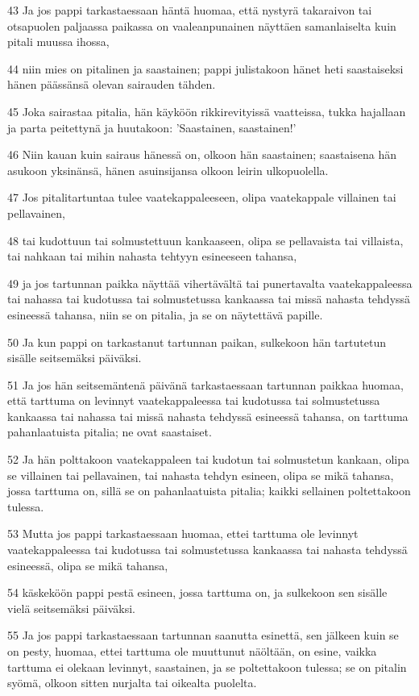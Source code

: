 \par 43 Ja jos pappi tarkastaessaan häntä huomaa, että nystyrä takaraivon tai otsapuolen paljaassa paikassa on vaaleanpunainen näyttäen samanlaiselta kuin pitali muussa ihossa,
\par 44 niin mies on pitalinen ja saastainen; pappi julistakoon hänet heti saastaiseksi hänen päässänsä olevan sairauden tähden.
\par 45 Joka sairastaa pitalia, hän käyköön rikkirevityissä vaatteissa, tukka hajallaan ja parta peitettynä ja huutakoon: 'Saastainen, saastainen!'
\par 46 Niin kauan kuin sairaus hänessä on, olkoon hän saastainen; saastaisena hän asukoon yksinänsä, hänen asuinsijansa olkoon leirin ulkopuolella.
\par 47 Jos pitalitartuntaa tulee vaatekappaleeseen, olipa vaatekappale villainen tai pellavainen,
\par 48 tai kudottuun tai solmustettuun kankaaseen, olipa se pellavaista tai villaista, tai nahkaan tai mihin nahasta tehtyyn esineeseen tahansa,
\par 49 ja jos tartunnan paikka näyttää vihertävältä tai punertavalta vaatekappaleessa tai nahassa tai kudotussa tai solmustetussa kankaassa tai missä nahasta tehdyssä esineessä tahansa, niin se on pitalia, ja se on näytettävä papille.
\par 50 Ja kun pappi on tarkastanut tartunnan paikan, sulkekoon hän tartutetun sisälle seitsemäksi päiväksi.
\par 51 Ja jos hän seitsemäntenä päivänä tarkastaessaan tartunnan paikkaa huomaa, että tarttuma on levinnyt vaatekappaleessa tai kudotussa tai solmustetussa kankaassa tai nahassa tai missä nahasta tehdyssä esineessä tahansa, on tarttuma pahanlaatuista pitalia; ne ovat saastaiset.
\par 52 Ja hän polttakoon vaatekappaleen tai kudotun tai solmustetun kankaan, olipa se villainen tai pellavainen, tai nahasta tehdyn esineen, olipa se mikä tahansa, jossa tarttuma on, sillä se on pahanlaatuista pitalia; kaikki sellainen poltettakoon tulessa.
\par 53 Mutta jos pappi tarkastaessaan huomaa, ettei tarttuma ole levinnyt vaatekappaleessa tai kudotussa tai solmustetussa kankaassa tai nahasta tehdyssä esineessä, olipa se mikä tahansa,
\par 54 käskeköön pappi pestä esineen, jossa tarttuma on, ja sulkekoon sen sisälle vielä seitsemäksi päiväksi.
\par 55 Ja jos pappi tarkastaessaan tartunnan saanutta esinettä, sen jälkeen kuin se on pesty, huomaa, ettei tarttuma ole muuttunut näöltään, on esine, vaikka tarttuma ei olekaan levinnyt, saastainen, ja se poltettakoon tulessa; se on pitalin syömä, olkoon sitten nurjalta tai oikealta puolelta.
